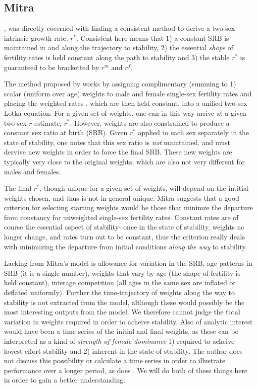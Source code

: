 \subsection{Mitra}

\citet{mitra1978derivation}, was directly cocerned with finding a consistent
method to derive a two-sex intrinsic growth rate, $r^\ast$. Consistent here
means that 1) a constant SRB is maintained in and along the trajectory to stability, 2) the
essential \textit{shape} of fertility rates is held constant along the path to
stability and 3) the stable $r^\ast$ is guaranteed to be bracketted by $r^m$ and
$r^f$.

The method proposed by \citet{mitra1978derivation} works by assigning
complimentary (summing to 1) scalar (uniform over age) weights to male and
female single-sex fertility rates and placing the weighted rates , which are
then held constant, into a unified two-sex Lotka equation. For a given set of
weights, one can in this way arrive at a given two-sex $r$ estimate, $r^\ast$. 
However, weights are also constrained to produce a constant 
sex ratio at birth (SRB). Given $r^\ast$ applied to each sex separately in the
state of stability, one notes that this sex ratio is \textit{not} maintained, and must dervive new weights
in order to force the final SRB. These new weights are typically very close to
the original weights, which are also not very different for males and females.

The final $r^\ast$, though unique for a given set of weights, will
depend on the intitial weights chosen, and thus is not in general unique. Mitra
suggests that a good criterion for selecting starting weights would be those
that minimze the departure from constancy for unweighted single-sex fertility
rates. Constant rates are of course the essential aspect of stability- once in
the state of stability, weights no longer change, and rates turn out to be
constant, thus the criterion really deals with minimizing the departure from
initial conditions \textit{along the way} to stability.

Lacking from Mitra's model is allowance for variation in the SRB, age patterns
in SRB (it is a single number), weights that vary by age (the shape of
fertility is held constant), interage competition (all ages in the same sex are
inflated or deflated uniformly). Further the time-trajectory of weights along
the way to stability is not extracted from the model, although these would
possibly be the most interesting outputs from the model. We therefore cannot
judge the total variation in weights required in order to acheive stability.
Also of analytic interest would have been a time series of the initial and final
weights, as these can be interpreted as a kind of \textit{strength of female
dominance} 1) required to acheive lowest-effort stability and 2) inherent in
the state of stability. The author does not discuss this possibility or
calculate a time series in order to illustrate performance over a longer 
period, as does \citet{gupta1973, gupta1978general}. We will do both of these
things here in order to gain a better understanding.

